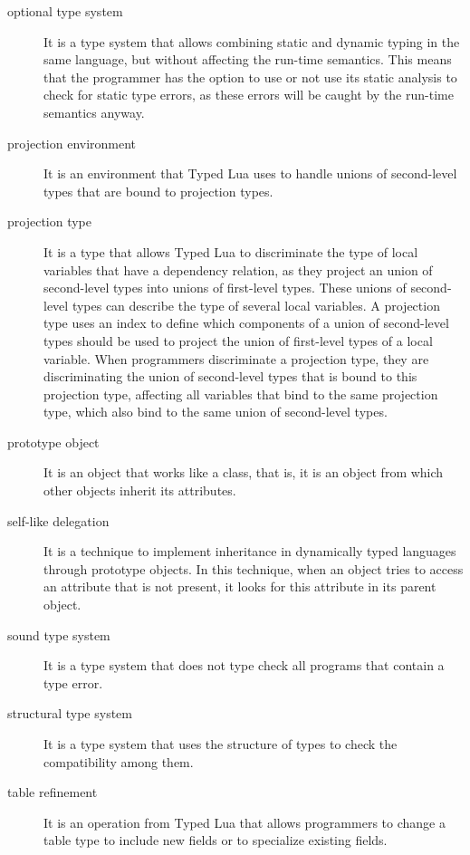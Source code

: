 \begin{description}
\item[optional type system] It is a type system that allows combining static and dynamic typing in the same
language, but without affecting the run-time semantics.
This means that the programmer has the option to use or not use its
static analysis to check for static type errors, as these errors
will be caught by the run-time semantics anyway.

\item[projection environment] It is an environment that Typed Lua uses to handle unions of second-level
types that are bound to projection types.

\item[projection type] It is a type that allows Typed Lua to discriminate the type of local variables
that have a dependency relation, as they project an union of second-level types
into unions of first-level types.
These unions of second-level types can describe the type of several local variables.
A projection type uses an index to define which components of a union of second-level
types should be used to project the union of first-level types of a local variable.
When programmers discriminate a projection type, they are discriminating the
union of second-level types that is bound to this projection type, affecting
all variables that bind to the same projection type, which also bind to the
same union of second-level types.

\item[prototype object] It is an object that works like a class, that is, it is an object from
which other objects inherit its attributes.

\item[self-like delegation] It is a technique to implement inheritance in dynamically typed languages
through prototype objects. 
In this technique, when an object tries to access an attribute that is not
present, it looks for this attribute in its parent object.

\item[sound type system] It is a type system that does not type check all programs that contain a type error.

\item[structural type system] It is a type system that uses the structure of types to check the compatibility among them.

\item[table refinement] It is an operation from Typed Lua that allows programmers to change a table type
to include new fields or to specialize existing fields.


\end{description}
